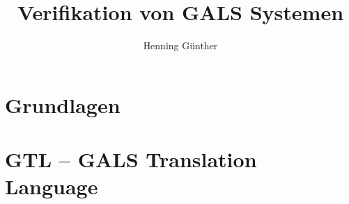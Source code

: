 \documentclass[10pt]{scrbook}
\title{Verifikation von GALS Systemen}
\author{Henning Günther}
\begin{document}
\maketitle

\tableofcontents

\chapter{Grundlagen}

\chapter{GTL -- GALS Translation Language}


\end{document}
